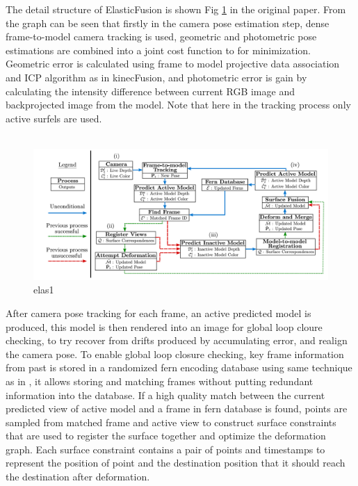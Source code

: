 \documentclass[12pt,twoside]{article}
\begin{document}
The detail structure of ElasticFusion is shown Fig \ref{fig:elas1} in the original paper. From the graph can be seen that firstly in the camera pose estimation step, dense frame-to-model camera tracking is used, geometric and photometric pose estimations are combined into a joint cost function to for minimization. Geometric error is calculated using frame to model projective data association and ICP algorithm as in kinecFusion\citep{newcombe2011kinectfusion}, and photometric error is gain by calculating the intensity difference between current RGB image and backprojected image from the model. Note that here in the tracking process only active surfels are used.\\
\\
\begin{figure}[h]
    \centering
    \includegraphics[width=1.0\textwidth]{figures/elas1}
    \caption{elas1}
    \label{fig:elas1}
\end{figure}
After camera pose tracking for each frame, an active predicted model is produced, this model is then rendered into an image for global loop cloure checking, to try recover from drifts produced by accumulating error, and realign the camera pose. To enable global loop closure checking, key frame information from past is stored in a randomized fern encoding database using same technique as in \cite{glocker2015real}, it allows storing and matching frames without putting redundant information into the database. If a high quality match between the current predicted view of active model and a frame in fern database is found, points are sampled from matched frame and active view to construct surface constraints that are used to register the surface together and optimize the deformation graph. Each surface constraint contains a pair of points and timestamps to represent the position of point and the destination position that it should reach the destination after deformation.\\
\\
\end{document}
